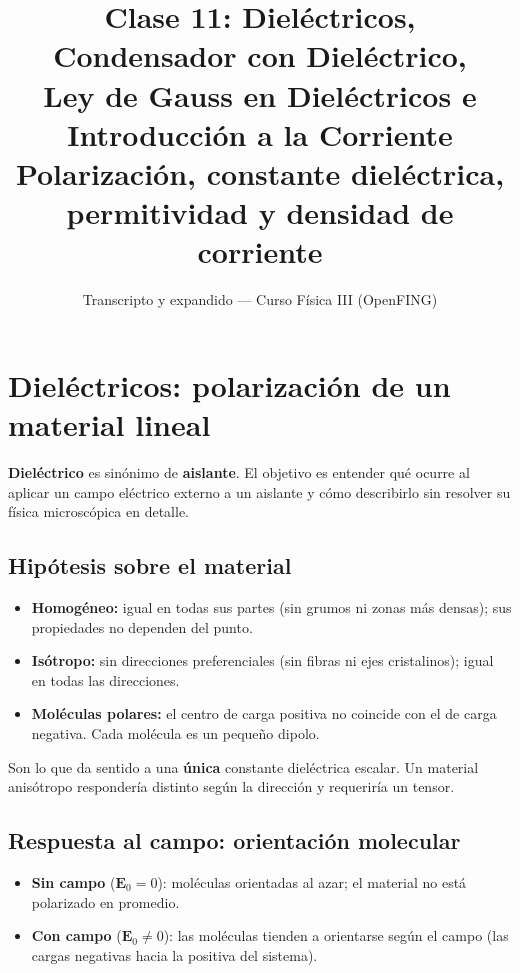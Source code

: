 \documentclass[12pt,a4paper]{article}
\title{\textbf{Clase 11: Dieléctricos, Condensador con Dieléctrico, \\
        Ley de Gauss en Dieléctricos e Introducción a la Corriente}\\[0.3em]
        \large{Polarización, constante dieléctrica, permitividad
              y densidad de corriente}}
\author{Transcripto y expandido --- Curso Física III (OpenFING)}
\date{}
\begin{document}
\maketitle
\thispagestyle{empty}
\newpage

\tableofcontents
\newpage

\section{Dieléctricos: polarización de un material lineal}

\textbf{Dieléctrico} es sinónimo de \textbf{aislante}. El objetivo es
entender qué ocurre al aplicar un campo eléctrico externo a un aislante y
cómo describirlo sin resolver su física microscópica en detalle.

\subsection{Hipótesis sobre el material}

\begin{itemize}[nosep]
  \item \textbf{Homogéneo:} igual en todas sus partes (sin grumos ni
        zonas más densas); sus propiedades no dependen del punto.
  \item \textbf{Isótropo:} sin direcciones preferenciales (sin fibras ni
        ejes cristalinos); igual en todas las direcciones.
  \item \textbf{Moléculas polares:} el centro de carga positiva no
        coincide con el de carga negativa. Cada molécula es un pequeño
        dipolo.
\end{itemize}

\begin{notebox}
  Son lo que da sentido a una \textbf{única} constante dieléctrica
  escalar. Un material anisótropo respondería distinto según la
  dirección y requeriría un tensor.
\end{notebox}

\subsection{Respuesta al campo: orientación molecular}

\begin{itemize}[nosep]
  \item \textbf{Sin campo} ($\mathbf{E}_0=0$): moléculas orientadas al
        azar; el material no está polarizado en promedio.
  \item \textbf{Con campo} ($\mathbf{E}_0\neq 0$): las moléculas tienden
        a orientarse según el campo (las cargas negativas hacia la
        positiva del sistema).
\end{itemize}
\end{document}
